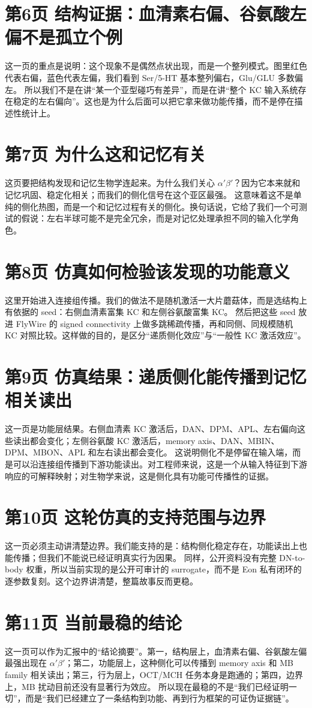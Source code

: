 \documentclass[11pt,fontset=none]{ctexart}
\begin{document}
\section*{第6页 结构证据：血清素右偏、谷氨酸左偏不是孤立个例}
这一页的重点是说明：这个现象不是偶然点状出现，而是一个整列模式。图里红色代表右偏，蓝色代表左偏，我们看到 Ser/5-HT 基本整列偏右，Glu/GLU 多数偏左。
所以我们不是在讲“某一个亚型碰巧有差异”，而是在讲“整个 KC 输入系统存在稳定的左右偏向”。这也是为什么后面可以把它拿来做功能传播，而不是停在描述性统计上。
\section*{第7页 为什么这和记忆有关}
这页要把结构发现和记忆生物学连起来。为什么我们关心 $\alpha'\beta'$？因为它本来就和记忆巩固、稳定化相关；而我们的侧化信号在这个亚区最强。
这意味着这不是单纯的侧化热图，而是一个和记忆过程有关的侧化。换句话说，它给了我们一个可测试的假说：左右半球可能不是完全冗余，而是对记忆处理承担不同的输入化学角色。
\section*{第8页 仿真如何检验该发现的功能意义}
这里开始进入连接组传播。我们的做法不是随机激活一大片蘑菇体，而是选结构上有依据的 seed：右侧血清素富集 KC 和左侧谷氨酸富集 KC。
然后把这些 seed 放进 FlyWire 的 signed connectivity 上做多跳稀疏传播，再和同侧、同规模随机 KC 对照比较。这样做的目的，是区分“递质侧化效应”与“一般性 KC 激活效应”。
\section*{第9页 仿真结果：递质侧化能传播到记忆相关读出}
这一页是功能层结果。右侧血清素 KC 激活后，DAN、DPM、APL、左右偏向这些读出都会变化；左侧谷氨酸 KC 激活后，memory axis、DAN、MBIN、DPM、MBON、APL 和左右读出都会变化。
这说明侧化不是停留在输入端，而是可以沿连接组传播到下游功能读出。对工程师来说，这是一个从输入特征到下游响应的可解释映射；对生物学来说，这是侧化具有功能可传播性的证据。
\section*{第10页 这轮仿真的支持范围与边界}
这一页必须主动讲清楚边界。我们能支持的是：结构侧化稳定存在，功能读出上也能传播；但我们不能说已经证明真实行为因果。
同样，公开资料没有完整 DN-to-body 权重，所以当前实现的是公开可审计的 surrogate，而不是 Eon 私有闭环的逐参数复刻。这个边界讲清楚，整篇故事反而更稳。
\section*{第11页 当前最稳的结论}
这一页可以作为汇报中的“结论摘要”。第一，结构层上，血清素右偏、谷氨酸左偏最强出现在 $\alpha'\beta'$；第二，功能层上，这种侧化可以传播到 memory axis 和 MB family 相关读出；第三，行为层上，OCT/MCH 任务本身是跑通的；第四，边界上，MB 扰动目前还没有显著行为效应。
所以现在最稳的不是“我们已经证明一切”，而是“我们已经建立了一条结构到功能、再到行为框架的可证伪证据链”。
\end{document}
